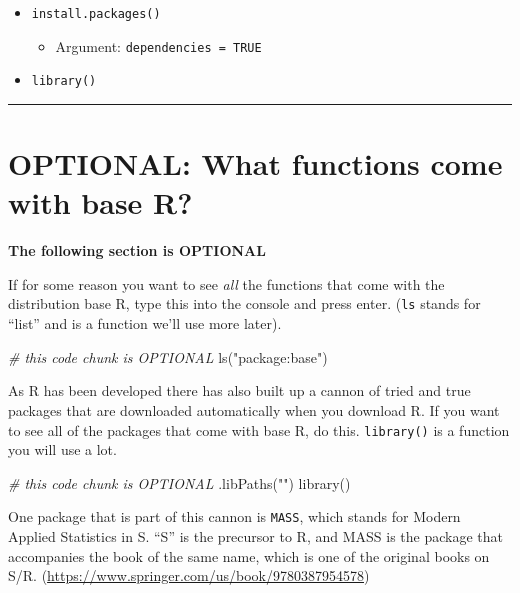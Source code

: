 \documentclass[
]{book}
\newenvironment{Shaded}{\begin{snugshade}}{\end{snugshade}}
\newcommand{\CommentTok}[1]{\textcolor[rgb]{0.56,0.35,0.01}{\textit{#1}}}
\newcommand{\FunctionTok}[1]{\textcolor[rgb]{0.00,0.00,0.00}{#1}}
\newcommand{\NormalTok}[1]{#1}
\newcommand{\StringTok}[1]{\textcolor[rgb]{0.31,0.60,0.02}{#1}}
\providecommand{\tightlist}{%
  \setlength{\itemsep}{0pt}\setlength{\parskip}{0pt}}
\begin{document}
\begin{itemize}
\tightlist
\item
  \texttt{install.packages()}

  \begin{itemize}
  \tightlist
  \item
    Argument: \texttt{dependencies\ =\ TRUE}
  \end{itemize}
\item
  \texttt{library()}
\end{itemize}

\begin{center}\rule{0.5\linewidth}{0.5pt}\end{center}

\hypertarget{optional-what-functions-come-with-base-r}{%
\section{OPTIONAL: What functions come with base R?}\label{optional-what-functions-come-with-base-r}}

\textbf{The following section is OPTIONAL}

If for some reason you want to see \emph{all} the functions that come with the distribution base R, type this into the console and press enter. (\texttt{ls} stands for ``list'' and is a function we'll use more later).

\begin{Shaded}
\begin{Highlighting}[]
\CommentTok{\# this code chunk is OPTIONAL}
\FunctionTok{ls}\NormalTok{(}\StringTok{"package:base"}\NormalTok{)}
\end{Highlighting}
\end{Shaded}

As R has been developed there has also built up a cannon of tried and true packages that are downloaded automatically when you download R. If you want to see all of the packages that come with base R, do this. \texttt{library()} is a function you will use a lot.

\begin{Shaded}
\begin{Highlighting}[]
\CommentTok{\# this code chunk is OPTIONAL}
\FunctionTok{.libPaths}\NormalTok{(}\StringTok{""}\NormalTok{) }
\FunctionTok{library}\NormalTok{()}
\end{Highlighting}
\end{Shaded}

One package that is part of this cannon is \texttt{MASS}, which stands for Modern Applied Statistics in S. ``S'' is the precursor to R, and MASS is the package that accompanies the book of the same name, which is one of the original books on S/R. (\url{https://www.springer.com/us/book/9780387954578})
\end{document}
